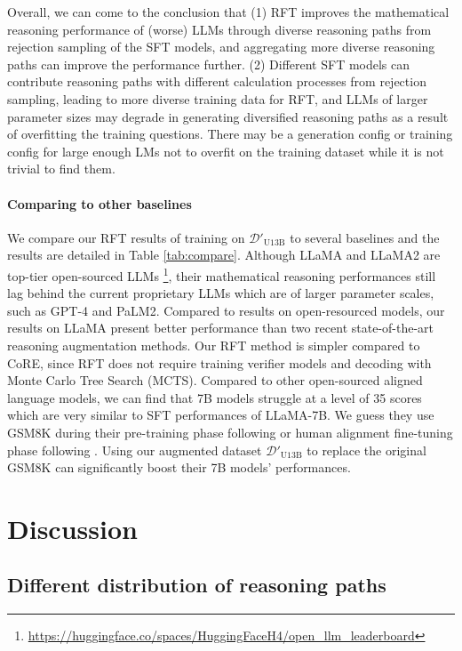 Overall, we can come to the conclusion that (1) RFT improves the mathematical reasoning performance of (worse) LLMs through diverse reasoning paths from rejection sampling of the SFT models, and aggregating more diverse reasoning paths can improve the performance further. (2) Different SFT models can contribute reasoning paths with different calculation processes from rejection sampling, leading to more diverse training data for RFT, and LLMs of larger parameter sizes may degrade in generating diversified reasoning paths as a result of overfitting the training questions. There may be a generation config or training config for large enough LMs not to overfit on the training dataset while it is not trivial to find them. 

\paragraph{Comparing to other baselines}

We compare our RFT results of training on $\mathcal{D}'_{\text{U13B}}$ to several baselines and the results are detailed in Table \ref{tab:compare}. Although LLaMA and LLaMA2 are top-tier open-sourced LLMs \footnote{\url{https://huggingface.co/spaces/HuggingFaceH4/open_llm_leaderboard}}, their mathematical reasoning performances still lag behind the current proprietary LLMs which are of larger parameter scales, such as GPT-4 and PaLM2. Compared to results on open-resourced models, our results on LLaMA present better performance than two recent state-of-the-art reasoning augmentation methods. Our RFT method is simpler compared to CoRE, since RFT does not require training verifier models and decoding with Monte Carlo Tree Search (MCTS). Compared to other open-sourced aligned language models, we can find that 7B models struggle at a level of 35 scores which are very similar to SFT performances of LLaMA-7B. We guess they use GSM8K during their pre-training phase following \citep{gpt4} or human alignment fine-tuning phase following \citep{alpaca-cot}. Using our augmented dataset $\mathcal{D}'_{\text{U13B}}$ to replace the original GSM8K can significantly boost their 7B models' performances.

\section{Discussion}

\subsection{Different distribution of reasoning paths}

